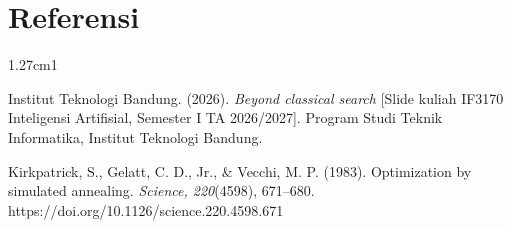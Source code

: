 \chapter*{Referensi}
\sloppy
\begin{hangparas}{1.27cm}{1}

Institut Teknologi Bandung. (2026). \textit{Beyond classical search} [Slide kuliah IF3170 Inteligensi Artifisial, Semester I TA 2026/2027]. Program Studi Teknik Informatika, Institut Teknologi Bandung.

Kirkpatrick, S., Gelatt, C. D., Jr., \& Vecchi, M. P. (1983). Optimization by simulated annealing. \textit{Science, 220}(4598), 671--680. https://doi.org/10.1126/science.220.4598.671

\end{hangparas}